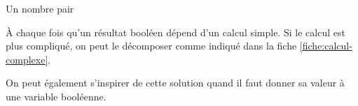 \begin{Fiche}{Un nombre pair}



	

	À chaque fois qu'un résultat booléen dépend d'un calcul simple.
	Si le calcul est plus compliqué, on peut le décomposer comme
	indiqué dans la fiche \vref{fiche:calcul-complexe}.
	
	On peut également s'inspirer de cette solution
	quand il faut donner sa valeur à une variable booléenne.
		
\end{Fiche}
